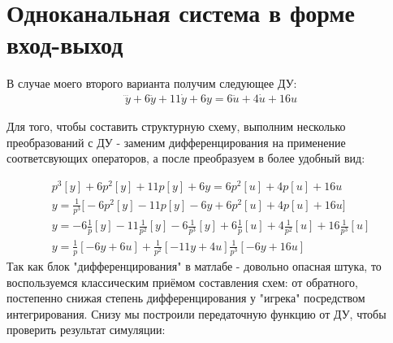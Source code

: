 \chapter{Одноканальная система в форме вход-выход}
\label{ch:chap1}



\lstset{style=mystyle}


В случае моего второго варианта получим следующее ДУ:
$$
\begin{aligned}
    \dddot{y} + 6\ddot{y} + 11\dot{y} + 6y = 6\ddot{u} + 4\dot{u} + 16u
\end{aligned}
$$

Для того, чтобы составить структурную схему, выполним несколько преобразований с ДУ - заменим дифференцирования на применение соответсвующих операторов, а после преобразуем в более удобный вид:

$$
\begin{aligned}
    p^3[y] + 6p^2[y] + 11p[y] + 6y = 6p^2[u] + 4p[u] + 16u \\
	y = \frac{1}{p^3} \bigg[ -6p^2[y] - 11p[y] -6y + 6p^2[u] + 4p[u] + 16u \bigg] \\
	y = -6\frac{1}{p}[y] - 11\frac{1}{p^2}[y] -6\frac{1}{p^3}[y] + 6\frac{1}{p}[u] + 4\frac{1}{p^2}[u] + 16\frac{1}{p^3}[u] \\
	y = \frac{1}{p}[-6y + 6u] + \frac{1}{p^2}[-11y + 4u] \frac{1}{p^3}[-6y + 16u]
\end{aligned}
$$
Так как блок "дифференцирования" в матлабе - довольно опасная штука, то воспользуемся классическим приёмом составления схем: от обратного, постепенно снижая степень дифференцирования у "игрека" посредством интегрирования. Снизу мы построили передаточную функцию от ДУ, чтобы проверить результат симуляции:

